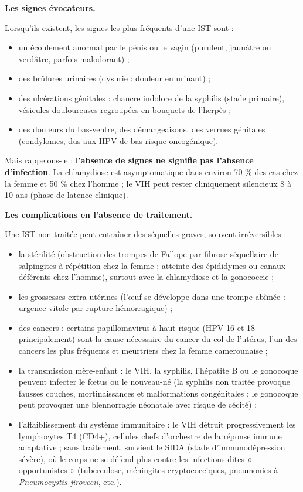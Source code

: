 \documentclass[11pt]{article}
\newcommand{\cle}[1]{{\popxbold\color{popdark}#1}}
\begin{document}
\textbf{Les signes évocateurs.}\par
Lorsqu'ils existent, les signes les plus fréquents d'une IST sont :
\begin{itemize}
\item un \cle{écoulement} anormal par le pénis ou le vagin (purulent, jaunâtre ou verdâtre, parfois malodorant) ;
\item des \cle{brûlures urinaires} (dysurie : douleur en urinant) ;
\item des \cle{ulcérations génitales} : chancre indolore de la syphilis (stade primaire), vésicules douloureuses regroupées en bouquets de l'herpès ;
\item des douleurs du bas-ventre, des démangeaisons, des verrues génitales (condylomes, dus aux HPV de bas risque oncogénique).
\end{itemize}
Mais rappelons-le : \textbf{l'absence de signes ne signifie pas l'absence d'infection}. La chlamydiose est asymptomatique dans environ 70 \% des cas chez la femme et 50 \% chez l'homme ; le VIH peut rester cliniquement silencieux 8 à 10 ans (phase de latence clinique).

\textbf{Les complications en l'absence de traitement.}\par
Une IST non traitée peut entraîner des séquelles graves, souvent irréversibles :
\begin{itemize}
\item la \cle{stérilité} (obstruction des trompes de Fallope par fibrose séquellaire de salpingites à répétition chez la femme ; atteinte des épididymes ou canaux déférents chez l'homme), surtout avec la chlamydiose et la gonococcie ;
\item les \cle{grossesses extra-utérines} (l'œuf se développe dans une trompe abîmée : urgence vitale par rupture hémorragique) ;
\item des \cle{cancers} : certains papillomavirus à haut risque (HPV 16 et 18 principalement) sont la cause nécessaire du cancer du col de l'utérus, l'un des cancers les plus fréquents et meurtriers chez la femme camerounaise ;
\item la \cle{transmission mère-enfant} : le VIH, la syphilis, l'hépatite B ou le gonocoque peuvent infecter le fœtus ou le nouveau-né (la syphilis non traitée provoque fausses couches, mortinaissances et malformations congénitales ; le gonocoque peut provoquer une blennorragie néonatale avec risque de cécité) ;
\item l'\cle{affaiblissement du système immunitaire} : le VIH détruit progressivement les lymphocytes T4 (CD4+), cellules chefs d'orchestre de la réponse immune adaptative ; sans traitement, survient le \cle{SIDA} (stade d'immunodépression sévère), où le corps ne se défend plus contre les infections dites « opportunistes » (tuberculose, méningites cryptococciques, pneumonies à \emph{Pneumocystis jirovecii}, etc.).
\end{itemize}
\end{document}
